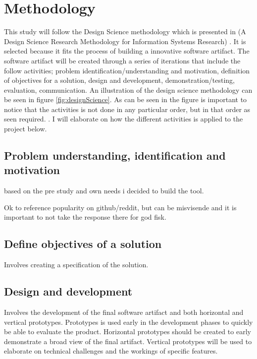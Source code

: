 \documentclass{article}
\begin{document}
\section{Methodology}
\label{methodology}
This study will follow the Design Science methodology which is presented in (A Design Science Research Methodology for Information Systems Research) \cite{10.2753/MIS0742-1222240302}. It is selected because it fits the process of building a innovative software artifact. The software artifact will be created through a series of iterations that include the follow activities; problem identification/understanding and motivation, definition of objectives for a solution, design and development, demonstration/testing, evaluation, communication.  An illustration of the design science methodology can be seen in figure \ref{fig:designScience}. As can be seen in the figure is important to notice that the activities is not done in any particular order, but in that order as seen required.  . I will elaborate on how the different activities is applied to the project below. 

\subsection{Problem understanding, identification and motivation}
based on the pre study and own needs i decided to build the tool.

Ok to reference popularity on github/reddit, but can be misvisende and it is important to not take the response there for god fisk.

\subsection{Define objectives of a solution}
Involves creating a specification of the solution.

\subsection{Design and development}
Involves the development of the final software artifact and both horizontal and vertical prototypes. Prototypes is used early in the development phases to quickly be able to evaluate the product. Horizontal prototypes should be created to early demonstrate a broad view of the final artifact. Vertical prototypes will be used to elaborate on technical challenges and the workings of specific features. 
 
\end{document}
